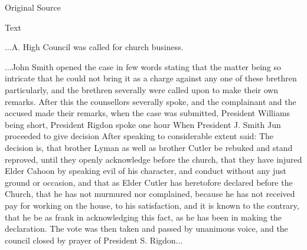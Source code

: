 			
			\begin{description}
				\item[Original Source]
			\end{description}
			
			
			\begin{description}
				\item[Text]
			\end{description}
			
				...A. High Council was called for church business.
				
				...John Smith opened the case in few words stating that the matter being so intricate that he could not bring it as a charge against any one of these brethren particularly, and the brethren severally were called upon to make their own remarks. After this the counsellors severally spoke, and the complainant and the accused made their remarks, when the case was submitted, President Williams being short, President Rigdon spoke one hour When President J. Smith Jun proceeded to give decision After speaking to considerable extent said: The decision is, that brother Lyman as well as brother Cutler be rebuked and stand reproved, until they openly acknowledge before the church, that they have injured Elder Cahoon by speaking evil of his character, and conduct without any just ground or occasion, and that as Elder Cutler has heretofore declared before the Church, that he has not murmured nor complained, because he has not received pay for working on the house, to his satisfaction, and it is known to the contrary, that he be as frank in acknowledging this fact, as he has been in making the declaration. The vote was then taken and passed by unanimous voice, and the council closed by prayer of President S. Rigdon...
				
